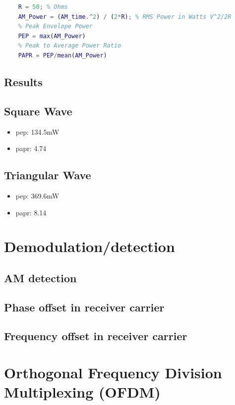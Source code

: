 \documentclass[a4paper]{article}
\begin{document}
\begin{lstlisting}[language=Matlab]
    % AM Power
    R = 50; % Ohms
    AM_Power = (AM_time.^2) / (2*R); % RMS Power in Watts V^2/2R
    % Peak Envelope Power
    PEP = max(AM_Power)
    % Peak to Average Power Ratio
    PAPR = PEP/mean(AM_Power)
\end{lstlisting}

\subsection{Results}
\subsection*{Square Wave}
\begin{itemize}
    \item \gls{pep}: 134.5mW
    \item \gls{papr}: 4.74
\end{itemize}

\subsection*{Triangular Wave}
\begin{itemize}
    \item \gls{pep}: 369.6mW
    \item \gls{papr}: 8.14
\end{itemize}

\section{Demodulation/detection}

\subsection{AM detection}

\subsection*{Phase offset in receiver carrier}

\subsection*{Frequency offset in receiver carrier}

\section{Orthogonal Frequency Division Multiplexing (OFDM)}
\end{document}
